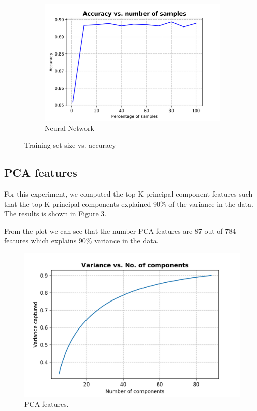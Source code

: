 \documentclass[10pt]{scrartcl}
\begin{document}
\begin{figure}[H]
	\begin{subfigure}{0.4\linewidth}
		\centering
		\includegraphics[width=1\linewidth]{figures/accuracy_vs_samples_neural_net_tuned.png}
		\caption{Neural Network}\label{fig:1b}
	\end{subfigure}
	\caption{Training set size vs. accuracy}\label{fig:1}
\end{figure}

\subsection*{PCA features}
For this experiment, we computed the top-K principal component features such that the top-K principal components explained 90\% of the variance in the data. 
The results is shown in Figure \ref{fig:pca_features}.

From the plot we can see that the number PCA features are 87 out of 784 features which explains 90\% variance in the data.
\begin{figure}[H]
\centering
\includegraphics[width=0.5\linewidth]{figures/pca_variance_vs_no_comp.png}
\caption{PCA features. \label{fig:pca_features}}
\end{figure}
\end{document}
